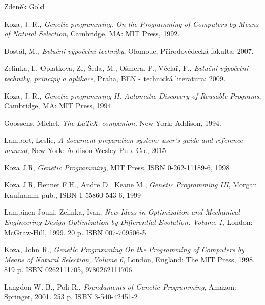 \documentclass[bc,male,java,dept460]{diploma}		%
\begin{document}
\bigskip
\begin{flushright}
Zdeněk Gold
\end{flushright}

\begin{thebibliography}{99}

 Koza, J. R.,
\textit{Genetic programming. On the Programming of Computers by Means of Natural Selection},
Cambridge, MA: MIT Press, 1992.

 Dostál, M.,
\textit{Evluční výpočetní techniky},
Olomouc, Přírodovědecká fakulta: 2007.

 Zelinka, I., Oplatkova, Z., Šeda, M., Ošmera, P., Včelař, F.,
\textit{Evluční výpočetní techniky, principy a aplikace},
Praha, BEN - technická literatura: 2009.

 Koza, J. R.,
\textit{Genetic programming II. Automatic Discovery of Reusable Programs},
Cambridge, MA: MIT Press, 1994.

 Goossens, Michel,
\textit{The \LaTeX\ companion,} New York: Addison, 1994.

 Lamport, Leslie,
\textit{A document preparation system: user's guide and reference manual},
New York: Addison-Wesley Pub. Co., 2015.

 Koza J.R, 
\textit{Genetic Programming},
MIT Press, ISBN 0-262-11189-6, 1998

 Koza J.R, Bennet F.H., Andre D., Keane M.,
\textit{Genetic Programming III},
Morgan Kaufnamm pub., ISBN 1-55860-543-6, 1999

 Lampinen Jouni, Zelinka, Ivan,
\textit{New Ideas in Optimization and Mechanical Engineering Design Optimization by Differential Evolution. Volume 1},
London: McGraw-Hill, 1999. 20 p. ISBN 007-709506-5

 Koza, John R.,
\textit{Genetic Programming On the Programming of Computers by Means of Natural Selection, Volume 6},
London, England: The MIT Press, 1998. 819 p. ISBN 0262111705, 9780262111706

 Langdon W. B., Poli R.,
\textit{Foundaments of Genetic Programming},
Amazon: Springer, 2001. 253 p. ISBN 3-540-42451-2

\end{thebibliography}
\end{document}

